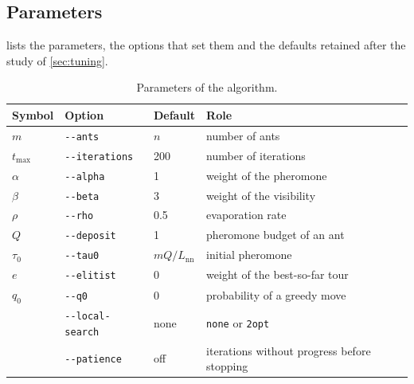 \documentclass[11pt,a4paper]{article}
\newcommand{\code}[1]{\texttt{#1}}
\begin{document}
\subsection{Parameters}

 lists the parameters, the options that set them and the defaults
retained after the study of \cref{sec:tuning}.

\begin{table}[htbp]
    \centering
    \caption{Parameters of the algorithm.}
    \label{tab:parameters}
    \begin{tabular}{@{}llll@{}}
        \toprule
        Symbol     & Option                  & Default              & Role                                        \\
        \midrule
        $m$        & \code{-{}-ants}         & $n$                  & number of ants                              \\
        $t_{\max}$ & \code{-{}-iterations}   & 200                  & number of iterations                        \\
        $\alpha$   & \code{-{}-alpha}        & 1                    & weight of the pheromone                     \\
        $\beta$    & \code{-{}-beta}         & 3                    & weight of the visibility                    \\
        $\rho$     & \code{-{}-rho}          & 0.5                  & evaporation rate                            \\
        $Q$        & \code{-{}-deposit}      & 1                    & pheromone budget of an ant                  \\
        $\tau_0$   & \code{-{}-tau0}         & $mQ/L_{\mathrm{nn}}$ & initial pheromone                           \\
        $e$        & \code{-{}-elitist}      & 0                    & weight of the best-so-far tour              \\
        $q_0$      & \code{-{}-q0}           & 0                    & probability of a greedy move                \\
                   & \code{-{}-local-search} & none                 & \code{none} or \code{2opt}                  \\
                   & \code{-{}-patience}     & off                  & iterations without progress before stopping \\
        \bottomrule
    \end{tabular}
\end{table}
\end{document}
